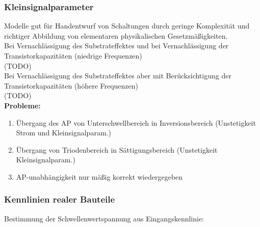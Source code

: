 \documentclass[european]{latex4ei_sheet}
\begin{document}
\begin{sectionbox}
	\subsubsection{Kleinsignalparameter}
	Modelle gut für Handentwurf von Schaltungen durch geringe Komplexität und richtiger Abbildung von elementaren physikalischen Gesetzmäßigkeiten.\\
	Bei Vernachlässigung des Substrateffektes und bei Vernachlässigung der Transistorkapazitäten (niedrige Frequenzen)\\
	(TODO)\\
	Bei Vernachlässigung des Substrateffektes aber mit Berücksichtigung der Transistorkapazitäten (höhere Frequenzen)\\
	(TODO)\\
	\textbf{Probleme:}
	\begin{enumerate}
		\item Übergang des AP von Unterschwellbereich in Inversionsbereich (Unstetigkeit Strom und Kleinsignalparam.)
		\item Übergang von Triodenbereich in Sättigungsbereich (Unstetigkeit Kleinsignalparam.)
		\item AP-unabhängigkeit nur mäßig korrekt wiedergegeben
	\end{enumerate}
\end{sectionbox}
\begin{sectionbox}
	\subsubsection{Kennlinien realer Bauteile}
	Bestimmung der Schwellenwertspannung aus Eingangskennlinie:\\
\end{sectionbox}
\end{document}
